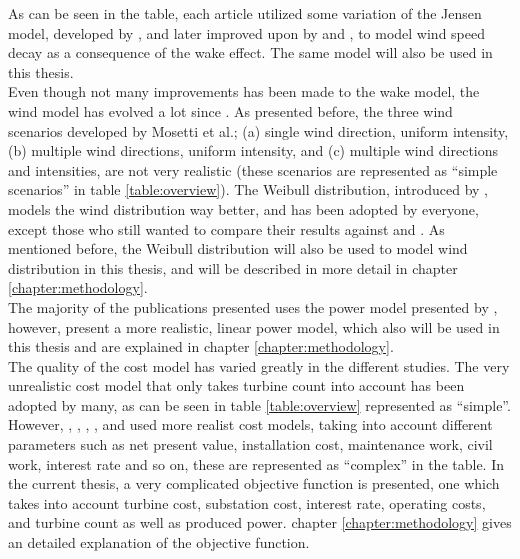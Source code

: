 \noindent As can be seen in the table, each article utilized some variation of the Jensen model, developed by \cite{Jensen}, and later improved upon by \cite{Katic} and \cite{Frandsen}, to model wind speed decay as a consequence of the wake effect. The same model will also be used in this thesis. \\

\noindent Even though not many improvements has been made to the wake model, the wind model has evolved a lot since \cite{Mosetti}. As presented before, the three wind scenarios developed by Mosetti et al.; (a) single wind direction, uniform intensity, (b) multiple wind directions, uniform intensity, and (c) multiple wind directions and intensities, are not very realistic (these scenarios are represented as ``simple scenarios'' in table \ref{table:overview}). The Weibull distribution, introduced by \cite{Mora}, models the wind distribution way better, and has been adopted by everyone, except those who still wanted to compare their results against \cite{Mosetti} and \cite{Grady}. As mentioned before, the Weibull distribution will also be used to model wind distribution in this thesis, and will be described in more detail in chapter \ref{chapter:methodology}. \\

\noindent The majority of the publications presented uses the power model presented by \cite{Mosetti}, however, \cite{Kusiak} present a more realistic, linear power model, which also will be used in this thesis and are explained in chapter \ref{chapter:methodology}.\\ 

\noindent The quality of the cost model has varied greatly in the different studies. The very unrealistic cost model that only takes turbine count into account has been adopted by many, as can be seen in table \ref{table:overview} represented as ``simple''. However, \citep{Mora}, \citep{Gonzalez}, \citep{Sisbot}, \citep{Saavedra-Morena}, and \citep{Chen} used more realist cost models, taking into account different parameters such as net present value, installation cost, maintenance work, civil work, interest rate and so on, these are represented as ``complex'' in the table. In the current thesis, a very complicated objective function is presented, one which takes into account turbine cost, substation cost, interest rate, operating costs, and turbine count as well as produced power. chapter \ref{chapter:methodology} gives an detailed explanation of the objective function. \\

